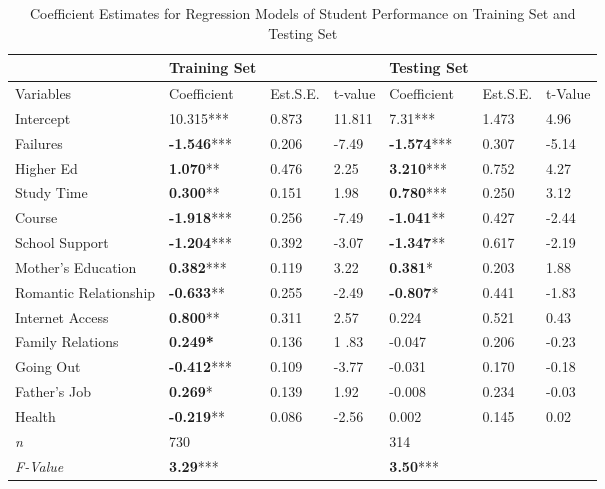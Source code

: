 \documentclass[sigconf]{acmart}
\begin{document}
\begin{table*}[ht]
  \caption{Coefficient Estimates for Regression Models of Student Performance on 
  Training Set and Testing Set}
  \label{tab:freq}
  \begin{tabular}{lllllll}
    \toprule
                        & Training Set  &           &         & Testing Set &         &          \\
    \midrule
    Variables           & Coefficient   & Est.S.E.  & t-value & Coefficient & Est.S.E.& t-Value  \\
    \midrule
    Intercept           &       10.315***    & 0.873 & 11.811 &          7.31***    & 1.473 &  4.96 \\
    Failures            & \textbf{-1.546}*** & 0.206 & -7.49  & \textbf{-1.574}***  & 0.307 & -5.14 \\
    Higher Ed           & \textbf{ 1.070}**  & 0.476 &   2.25 & \textbf{ 3.210}***  & 0.752 &  4.27 \\
    Study Time          & \textbf{ 0.300}**  & 0.151 &   1.98 & \textbf{ 0.780}***  & 0.250 &  3.12 \\
    Course              & \textbf{-1.918}*** & 0.256 & -7.49  & \textbf{-1.041}**   & 0.427 & -2.44 \\
    School Support      & \textbf{-1.204}*** & 0.392 & -3.07  & \textbf{-1.347}**   & 0.617 & -2.19 \\
    Mother's Education  & \textbf{ 0.382}*** & 0.119 &   3.22 & \textbf{ 0.381}*    & 0.203 &  1.88 \\
    Romantic Relationship& \textbf{-0.633}** & 0.255 &  -2.49 & \textbf{-0.807}*    & 0.441 & -1.83 \\
    Internet Access     & \textbf{ 0.800}**  & 0.311 &   2.57 &          0.224      & 0.521 &  0.43 \\
    Family Relations    & \textbf{ 0.249*}   & 0.136 &  1 .83 &         -0.047      & 0.206 & -0.23 \\
    Going Out           & \textbf{-0.412}*** & 0.109 &  -3.77 &         -0.031      & 0.170 & -0.18 \\
    Father's Job        & \textbf{ 0.269}*   & 0.139 &   1.92 &         -0.008      & 0.234 & -0.03 \\
    Health              & \textbf{-0.219}**  & 0.086 &  -2.56 &          0.002      & 0.145 &  0.02 \\
    \midrule
    \textit{n}          & 730                &       &        &         314         &       &       \\
    \textit{F-Value}    & \textbf{3.29}***   &       &        & \textbf{3.50}***    &       &       \\

\end{tabular}
\end{table*}
\end{document}
